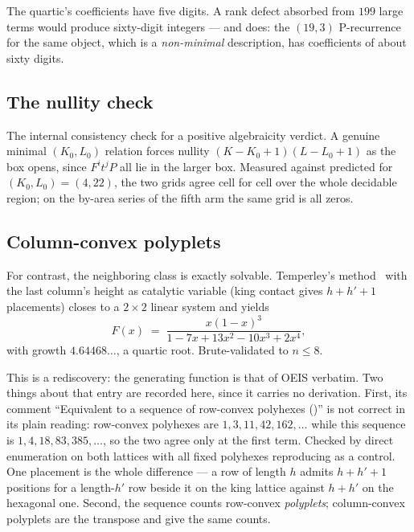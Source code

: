 \documentclass[11pt]{article}
\begin{document}
\begin{remark}
The quartic's coefficients have five digits. A rank defect absorbed from $199$
large terms would produce sixty-digit integers --- and does: the $(19,3)$
P-recurrence for the same object, which is a \emph{non-minimal} description, has
coefficients of about sixty digits.
\end{remark}

\subsection{The nullity check}

The internal consistency check for a positive algebraicity verdict. A genuine
minimal $(K_0,L_0)$ relation forces nullity $(K-K_0+1)(L-L_0+1)$ as the box
opens, since $F^it^jP$ all lie in the larger box. Measured against predicted for
$(K_0,L_0) = (4,22)$, the two grids agree cell for cell over the whole decidable
region; on the by-area series of the fifth arm the same grid is all zeros.

\subsection{Column-convex polyplets}

For contrast, the neighboring class is exactly solvable.
Temperley's method~\cite{temperley1956} with the last column's height as
catalytic variable (king contact gives $h + h' + 1$ placements) closes to a
$2\times2$ linear system and yields
\[
  F(x) \;=\; \frac{x(1-x)^3}{1 - 7x + 13x^2 - 10x^3 + 2x^4},
\]
with growth $4.64468\dots$, a quartic root. Brute-validated to $n \le 8$.

This is a rediscovery: the generating function is that of OEIS 
verbatim. Two things about that entry are recorded here, since it carries no
derivation. First, its comment ``Equivalent to a sequence of row-convex
polyhexes ()'' is not correct in its plain reading: row-convex
polyhexes are $1,3,11,42,162,\dots$ while this sequence is $1,4,18,83,385,\dots$,
so the two agree only at the first term. Checked by direct enumeration on both
lattices with all fixed polyhexes reproducing  as a control. One
placement is the whole difference --- a row of length $h$ admits $h + h' + 1$
positions for a length-$h'$ row beside it on the king lattice against $h + h'$
on the hexagonal one. Second, the sequence counts row-convex
\emph{polyplets}; column-convex polyplets are the transpose and give the same
counts.
\end{document}
